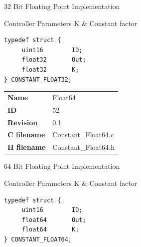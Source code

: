 32 Bit Floating Point Implementation

\begin{XtoCtabular}{Controller Parameters}
K & Constant factor\tabularnewline
\hline
\end{XtoCtabular}

\begin{lstlisting}
typedef struct {
     uint16        ID;
     float32       Out;
     float32       K;
} CONSTANT_FLOAT32;
\end{lstlisting}

\ifdefined \AddTestReports
{}
\fi
{}
\nopagebreak[0]
\begin{tabular}{l l}
\textbf{Name} & Float64 \tabularnewline
\textbf{ID} & 52 \tabularnewline
\textbf{Revision} & 0.1 \tabularnewline
\textbf{C filename} & Constant\_Float64.c \tabularnewline
\textbf{H filename} & Constant\_Float64.h \tabularnewline
\end{tabular}
\vspace{1ex}

64 Bit Floating Point Implementation

\begin{XtoCtabular}{Controller Parameters}
K & Constant factor\tabularnewline
\hline
\end{XtoCtabular}

\begin{lstlisting}
typedef struct {
     uint16        ID;
     float64       Out;
     float64       K;
} CONSTANT_FLOAT64;
\end{lstlisting}

\ifdefined \AddTestReports
{}
\fi
